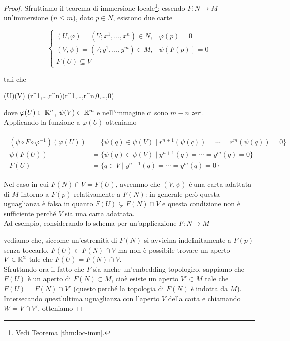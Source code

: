 \begin{proof}
	Sfruttiamo il teorema di immersione locale\footnote{%
		Vedi Teorema \ref{thm:loc-imm}.%
	}: essendo $ F : N \to M $ un'immersione ($ n \leqslant m $), dato $ p \in N $, esistono due carte
	
	\begin{equation}
		\begin{cases}
			(U,\varphi) = (U; x^{1},\dots,x^{n}) \in N, & \varphi(p) = 0 \\
			(V,\psi) = (V; y^{1},\dots,y^{m}) \in M, & \psi(F(p)) = 0 \\
			F(U) \subseteq V
		\end{cases}
	\end{equation}
	
	tali che
	
		{\varphi(U)}{\psi(V)}
		{(r^{1},\dots,r^{n})}{(r^{1},\dots,r^{n},0,\dots,0)}

	dove $ \varphi(U) \subset \mathbb{R}^{n} $, $ \psi(V) \subset \mathbb{R}^{m} $ e nell'immagine ci sono $ m-n $ zeri. \\
	Applicando la funzione a $ \varphi(U) $ otteniamo
	
	\begin{align}
		\begin{split}
			(\psi \circ F \circ \varphi^{-1})(\varphi(U)) &= \{ \psi(q) \in \psi(V) \mid r^{n+1}(\psi(q)) = \cdots = r^{m}(\psi(q)) = 0 \} \\
			\psi(F(U)) &= \{ \psi(q) \in \psi(V) \mid y^{n+1}(q) = \cdots = y^{m}(q) = 0 \} \\
			F(U) &= \{ q \in V \mid y^{n+1}(q) = \cdots = y^{m}(q) = 0 \}
		\end{split}
	\end{align}

	Nel caso in cui $ F(N) \cap V = F(U) $, avremmo che $ (V,\psi) $ è una carta adattata di $ M $ intorno a $ F(p) $ relativamente a $ F(N) $: in generale però questa uguaglianza è falsa in quanto $ F(U) \subsetneq F(N) \cap V $ e questa condizione non è sufficiente perché $ V $ sia una carta adattata. \\
	Ad esempio, considerando lo schema per un'applicazione $ F : N \to M $
	
	
	vediamo che, siccome un'estremità di $ F(N) $ si avvicina indefinitamente a $ F(p) $ senza toccarlo, $ F(U) \subset F(N) \cap V $ ma non è possibile trovare un aperto $ V \in \mathbb{R}^{2} $ tale che $ F(U) = F(N) \cap V $. \\
	Sfruttando ora il fatto che $ F $ sia anche un'embedding topologico, sappiamo che $ F(U) $ è un aperto di $ F(N) \subset M $, cioè esiste un aperto $ V' \subset M $ tale che $ F(U) = F(N) \cap V' $ (questo perché la topologia di $ F(N) $ è indotta da $ M $). Intersecando quest'ultima uguaglianza con l'aperto $ V $ della carta e chiamando $ W \doteq V \cap V' $, otteniamo
	

\end{proof}
